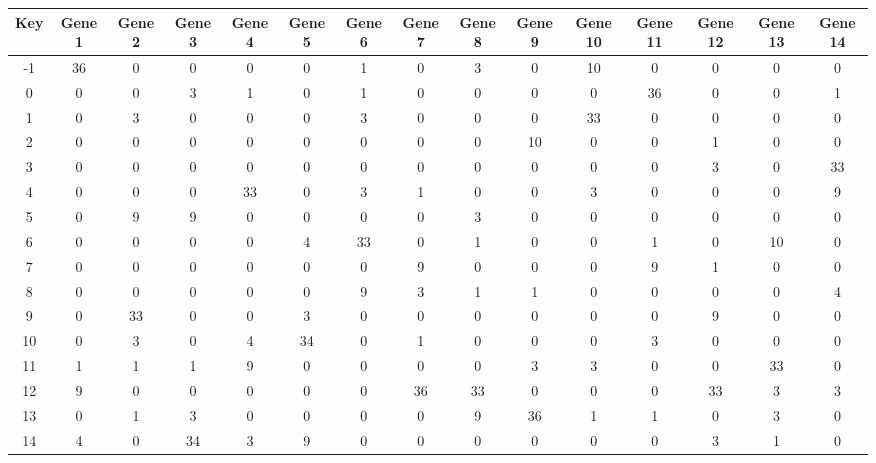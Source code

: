\begin{tabular}{|c|c|c|c|c|c|c|c|c|c|c|c|c|c|c|}
\hline
Key & Gene 1 & Gene 2 & Gene 3 & Gene 4 & Gene 5 & Gene 6 & Gene 7 & Gene 8 & Gene 9 & Gene 10 & Gene 11 & Gene 12 & Gene 13 & Gene 14 \\
\hline
-1 & 36 & 0 & 0 & 0 & 0 & 1 & 0 & 3 & 0 & 10 & 0 & 0 & 0 & 0 \\
0 & 0 & 0 & 3 & 1 & 0 & 1 & 0 & 0 & 0 & 0 & 36 & 0 & 0 & 1 \\
1 & 0 & 3 & 0 & 0 & 0 & 3 & 0 & 0 & 0 & 33 & 0 & 0 & 0 & 0 \\
2 & 0 & 0 & 0 & 0 & 0 & 0 & 0 & 0 & 10 & 0 & 0 & 1 & 0 & 0 \\
3 & 0 & 0 & 0 & 0 & 0 & 0 & 0 & 0 & 0 & 0 & 0 & 3 & 0 & 33 \\
4 & 0 & 0 & 0 & 33 & 0 & 3 & 1 & 0 & 0 & 3 & 0 & 0 & 0 & 9 \\
5 & 0 & 9 & 9 & 0 & 0 & 0 & 0 & 3 & 0 & 0 & 0 & 0 & 0 & 0 \\
6 & 0 & 0 & 0 & 0 & 4 & 33 & 0 & 1 & 0 & 0 & 1 & 0 & 10 & 0 \\
7 & 0 & 0 & 0 & 0 & 0 & 0 & 9 & 0 & 0 & 0 & 9 & 1 & 0 & 0 \\
8 & 0 & 0 & 0 & 0 & 0 & 9 & 3 & 1 & 1 & 0 & 0 & 0 & 0 & 4 \\
9 & 0 & 33 & 0 & 0 & 3 & 0 & 0 & 0 & 0 & 0 & 0 & 9 & 0 & 0 \\
10 & 0 & 3 & 0 & 4 & 34 & 0 & 1 & 0 & 0 & 0 & 3 & 0 & 0 & 0 \\
11 & 1 & 1 & 1 & 9 & 0 & 0 & 0 & 0 & 3 & 3 & 0 & 0 & 33 & 0 \\
12 & 9 & 0 & 0 & 0 & 0 & 0 & 36 & 33 & 0 & 0 & 0 & 33 & 3 & 3 \\
13 & 0 & 1 & 3 & 0 & 0 & 0 & 0 & 9 & 36 & 1 & 1 & 0 & 3 & 0 \\
14 & 4 & 0 & 34 & 3 & 9 & 0 & 0 & 0 & 0 & 0 & 0 & 3 & 1 & 0 \\
\hline
\end{tabular}